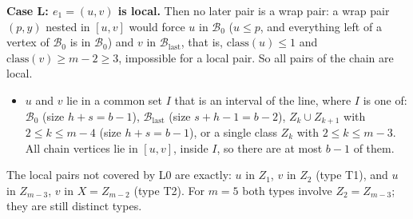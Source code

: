 \documentclass[11pt]{article}
\newcommand{\Bfirst}{\mathcal{B}_0}
\newcommand{\Blast}{\mathcal{B}_{\mathrm{last}}}
\theoremstyle{plain}
\theoremstyle{remark}
\begin{document}
\textbf{Case L: $e_1 = (u, v)$ is local.} Then no later pair is a wrap pair: a wrap pair $(p, y)$ nested in
$[u, v]$ would force $u$ in $\Bfirst$ ($u \leq p$, and everything left of a vertex of $\Bfirst$ is in $\Bfirst$)
and $v$ in $\Blast$, that is, $\mathrm{class}(u) \leq 1$ and $\mathrm{class}(v) \geq m-2 \geq 3$, impossible for a
local pair. So all pairs of the chain are local.
\begin{itemize}
  \item[L0:] $u$ and $v$ lie in a common set $I$ that is an interval of the line, where $I$ is one of: $\Bfirst$
  (size $h+s = b-1$), $\Blast$ (size $s+h-1 = b-2$), $Z_k \cup Z_{k+1}$ with $2 \leq k \leq m-4$ (size
  $h+s = b-1$), or a single class $Z_k$ with $2 \leq k \leq m-3$. All chain vertices lie in $[u, v]$, inside $I$,
  so there are at most $b-1$ of them.
\end{itemize}
The local pairs not covered by L0 are exactly: $u$ in $Z_1$, $v$ in $Z_2$ (type T1), and $u$ in $Z_{m-3}$, $v$ in
$X = Z_{m-2}$ (type T2). For $m = 5$ both types involve $Z_2 = Z_{m-3}$; they are still distinct types.
\end{document}
